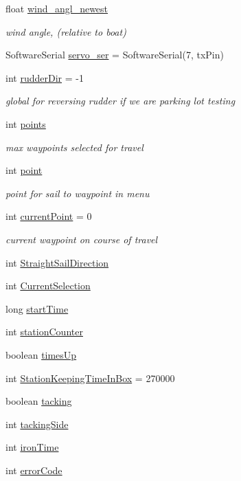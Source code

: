 \begin{DoxyCompactItemize}
float \hyperlink{group__group1_ga9fcee93bab7f0c81f67b99f8b8597e9c}{wind\-\_\-angl\-\_\-newest}
\begin{DoxyCompactList}\small\item\em wind angle, (relative to boat) \end{DoxyCompactList}\item 
\-Software\-Serial \hyperlink{group__group1_gad08dcd7d87414b8d7f7e9cf2689ea5d8}{servo\-\_\-ser} = \-Software\-Serial(7, tx\-Pin)
\item 
int \hyperlink{group__group1_gaf79de3204853b3b4101113683e74cd54}{rudder\-Dir} = -\/1
\begin{DoxyCompactList}\small\item\em global for reversing rudder if we are parking lot testing \end{DoxyCompactList}\item 
int \hyperlink{group__group1_gaf7f8f4a4e39e09fdb5e9f02330ecabef}{points}
\begin{DoxyCompactList}\small\item\em max waypoints selected for travel \end{DoxyCompactList}\item 
int \hyperlink{group__group1_ga2dee8b7fcecc7c2d190e9304b43ea886}{point}
\begin{DoxyCompactList}\small\item\em point for sail to waypoint in menu \end{DoxyCompactList}\item 
int \hyperlink{group__group1_ga9c43dea25777e23791d530b06f6715f1}{current\-Point} = 0
\begin{DoxyCompactList}\small\item\em current waypoint on course of travel \end{DoxyCompactList}\item 
int \hyperlink{group__group1_gac9d865c1411ae815f6b2394c45d604e7}{\-Straight\-Sail\-Direction}
\item 
int \hyperlink{group__group1_ga79863a7d6b31d0c89c5050c2cd931cfe}{\-Current\-Selection}
\item 
long \hyperlink{group__group1_ga8ad49a66e91d8658c5f1f7dbcbcbbd2f}{start\-Time}
\item 
int \hyperlink{group__group1_gaffc96d075c8796c3d5ef3dc5824c0819}{station\-Counter}
\item 
boolean \hyperlink{group__group1_gaf453f5fa6c0df67707ca308a2fc80ca1}{times\-Up}
\item 
int \hyperlink{group__group1_gabe157ddfb46568e2de8b041f54ac6d98}{\-Station\-Keeping\-Time\-In\-Box} = 270000
\item 
boolean \hyperlink{group__group1_gab23a7a79ede8d141fa92f4475d36fb24}{tacking}
\item 
int \hyperlink{group__group1_gabdfa4a25e22806c47eebd4c9826ef7a6}{tacking\-Side}
\item 
int \hyperlink{group__group1_ga332365589e9af9d8ec4d1c5663034132}{iron\-Time}
\item 
int \hyperlink{group__group1_gab675a39a0c7f0587be9ae6734db7ac80}{error\-Code}
\end{DoxyCompactItemize}


